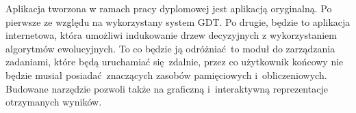 Aplikacja tworzona w ramach pracy dyplomowej jest aplikacją oryginalną. Po pierwsze ze względu na wykorzystany system GDT. Po drugie, będzie to aplikacja internetowa, która umożliwi indukowanie drzew decyzyjnych z wykorzystaniem algorytmów ewolucyjnych. To co będzie ją odróżniać to moduł do zarządzania zadaniami, które będą uruchamiać się zdalnie, przez co użytkownik końcowy nie będzie musiał posiadać znaczących zasobów pamięciowych i~obliczeniowych. Budowane narzędzie pozwoli także na graficzną i~interaktywną reprezentacje otrzymanych wyników.
